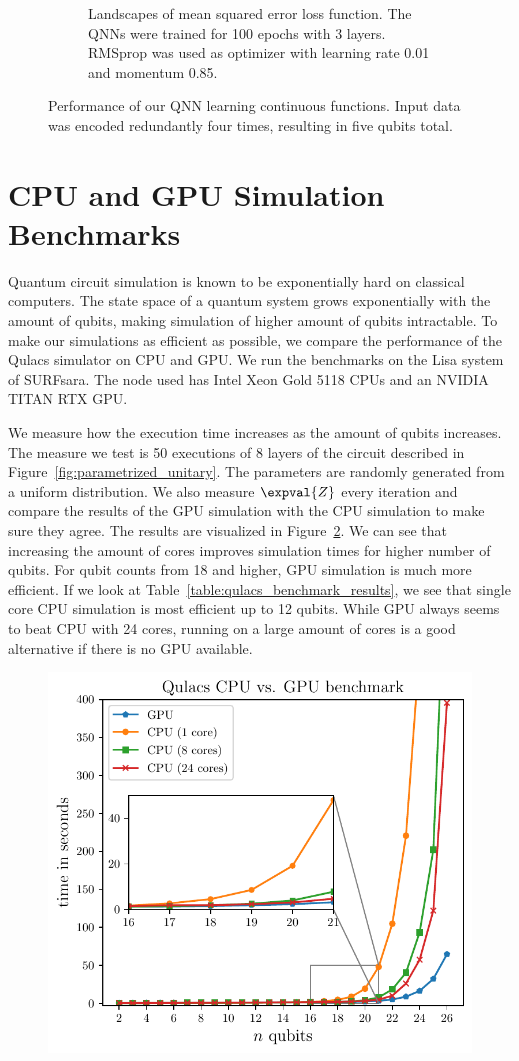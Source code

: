 \documentclass[a4paper,10pt]{article}
\begin{document}
\begin{appendices}
\begin{figure}[ht]
\begin{subfigure}{.4875\textwidth}
		\caption{Landscapes of mean squared error loss function. The QNNs were trained for 100 epochs with 3 layers. RMSprop was used as optimizer with learning rate 0.01 and momentum 0.85.}
	\end{subfigure}
	\caption{Performance of our QNN learning continuous functions. Input data was encoded redundantly four times, resulting in five qubits total.}
	\label{fig:qnn_regression_results}
\end{figure}

\section{CPU and GPU Simulation Benchmarks} \label{sec:cpu-gpu-benchmark}
Quantum circuit simulation is known to be exponentially hard on classical computers.
The state space of a quantum system grows exponentially with the amount of qubits, making simulation of higher amount of qubits intractable.
To make our simulations as efficient as possible, we compare the performance of the Qulacs simulator on CPU and GPU.
We run the benchmarks on the Lisa system of SURFsara.
The node used has Intel Xeon Gold 5118 CPUs and an NVIDIA TITAN RTX GPU.

We measure how the execution time increases as the amount of qubits increases.
The measure we test is 50 executions of 8 layers of the circuit described in Figure~\ref{fig:parametrized_unitary}.
The parameters are randomly generated from a uniform distribution.
We also measure $\expval{Z}$ every iteration and compare the results of the GPU simulation with the CPU simulation to make sure they agree.
The results are visualized in Figure~\ref{fig:qulacs_benchmark}.
We can see that increasing the amount of cores improves simulation times for higher number of qubits.
For qubit counts from 18 and higher, GPU simulation is much more efficient.
If we look at Table~\ref{table:qulacs_benchmark_results}, we see that single core CPU simulation is most efficient up to 12 qubits.
While GPU always seems to beat CPU with 24 cores, running on a large amount of cores is a good alternative if there is no GPU available.

\begin{figure}[ht]
	\centering
	\includegraphics[width=0.6\linewidth]{figures/qnn_cpu_vs_gpu.pdf}
	\label{fig:qulacs_benchmark}
\end{figure}


\end{appendices}
\end{document}
